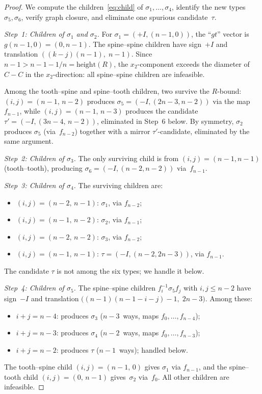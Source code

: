 \documentclass{amsart}
\theoremstyle{definition}
\theoremstyle{remark}
\begin{document}
\begin{proof}
We compute the children~\eqref{eq:child} of $\sigma_1, \ldots, \sigma_4$,
identify the new types $\sigma_5, \sigma_6$, verify graph closure, and
eliminate one spurious candidate~$\tau$.

\emph{Step~1: Children of $\sigma_1$ and $\sigma_2$.}
For $\sigma_1 = (+I, (n{-}1, 0))$, the ``$gt$'' vector is
$g(n{-}1, 0) = (0, n{-}1)$.  The spine--spine children have
sign~$+I$ and translation $((k{-}j)(n{-}1),\; n{-}1)$.  Since
$n{-}1 > n{-}1{-}1/n = \mathrm{height}(R)$, the $x_2$-component
exceeds the diameter of $C{-}C$ in the $x_2$-direction: all
spine--spine children are infeasible.

Among the tooth--spine and spine--tooth children, two survive the
$R$-bound: $(i, j) = (n{-}1,\, n{-}2)$ produces
$\sigma_5 = (-I, (2n{-}3, n{-}2))$ via the map~$f_{n-1}$, while
$(i, j) = (n{-}1,\, n{-}3)$ produces the candidate
$\tau' = (-I, (3n{-}4,\, n{-}2))$, eliminated in Step~6 below.
By symmetry, $\sigma_2$ produces $\sigma_5$ (via~$f_{n-2}$) together
with a mirror $\tau'$-candidate, eliminated by the same argument.

\emph{Step~2: Children of $\sigma_3$.}
The only surviving child is from $(i, j) = (n{-}1, n{-}1)$
(tooth--tooth), producing $\sigma_6 = (-I, (n{-}2, n{-}2))$
via~$f_{n-1}$.

\emph{Step~3: Children of $\sigma_4$.}
The surviving children are:
\begin{itemize}
\item $(i, j) = (n{-}2,\, n{-}1)$: $\sigma_1$, via $f_{n-2}$;
\item $(i, j) = (n{-}1,\, n{-}2)$: $\sigma_2$, via $f_{n-1}$;
\item $(i, j) = (n{-}2,\, n{-}2)$: $\sigma_3$, via $f_{n-2}$;
\item $(i, j) = (n{-}1,\, n{-}1)$: $\tau = (-I, (n{-}2, 2n{-}3))$,
via $f_{n-1}$.
\end{itemize}
The candidate $\tau$ is not among the six types; we handle it below.

\emph{Step~4: Children of $\sigma_5$.}
The spine--spine children $f_i^{-1} \sigma_5 f_j$ with
$i, j \le n{-}2$ have sign~$-I$ and translation
$\bigl((n{-}1)(n{-}1{-}i{-}j) - 1,\; 2n{-}3\bigr)$.
Among these:
\begin{itemize}
\item $i + j = n{-}4$: produces $\sigma_3$
  ($n{-}3$~ways, maps $f_0, \ldots, f_{n-4}$);
\item $i + j = n{-}3$: produces $\sigma_4$
  ($n{-}2$~ways, maps $f_0, \ldots, f_{n-3}$);
\item $i + j = n{-}2$: produces $\tau$
  ($n{-}1$~ways); handled below.
\end{itemize}
The tooth--spine child $(i, j) = (n{-}1,\, 0)$ gives $\sigma_1$
via $f_{n-1}$, and the spine--tooth child $(i, j) = (0,\, n{-}1)$
gives~$\sigma_2$ via~$f_0$.
All other children are infeasible.


\end{proof}
\end{document}
